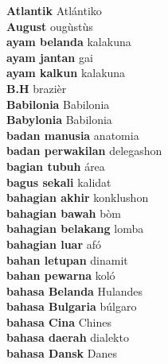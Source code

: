 \textbf{ Atlantik  } Atlántiko \\
\textbf{ August  } ougùstùs \\
\textbf{ ayam belanda  } kalakuna \\
\textbf{ ayam jantan  } gai \\
\textbf{ ayam kalkun  } kalakuna \\
\textbf{ B.H  } brazièr \\
\textbf{ Babilonia  } Babilonia \\
\textbf{ Babylonia  } Babilonia \\
\textbf{ badan manusia  } anatomia \\
\textbf{ badan perwakilan  } delegashon \\
\textbf{ bagian tubuh  } área \\
\textbf{ bagus sekali  } kalidat \\
\textbf{ bahagian akhir  } konklushon \\
\textbf{ bahagian bawah  } bòm \\
\textbf{ bahagian belakang  } lomba \\
\textbf{ bahagian luar  } afó \\
\textbf{ bahan letupan  } dinamit \\
\textbf{ bahan pewarna  } koló \\
\textbf{ bahasa Belanda  } Hulandes \\
\textbf{ bahasa Bulgaria  } búlgaro \\
\textbf{ bahasa Cina  } Chines \\
\textbf{ bahasa daerah  } dialekto \\
\textbf{ bahasa Dansk  } Danes \\
